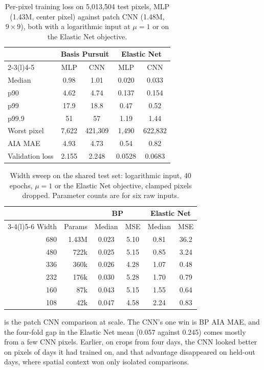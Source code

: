 \begin{table}[h]
\centering
\small
\caption{Per-pixel training loss on 5,013,504 test pixels, MLP (1.43M, center pixel) against patch CNN (1.48M, $9\times9$), both with a logarithmic input at $\mu=1$ or on the Elastic Net objective.}
\label{tab:cnn}
\begin{tabular}{@{}lcccc@{}}
\toprule
 & \multicolumn{2}{c}{Basis Pursuit} & \multicolumn{2}{c}{Elastic Net}\\
\cmidrule(lr){2-3}\cmidrule(l){4-5}
 & MLP & CNN & MLP & CNN\\
\midrule
Median & 0.98 & 1.01 & 0.020 & 0.033\\
p90 & 4.62 & 4.74 & 0.137 & 0.154\\
p99 & 17.9 & 18.8 & 0.47 & 0.52\\
p99.9 & 51 & 57 & 1.19 & 1.44\\
Worst pixel & 7,622 & 421,309 & 1,490 & 622,832\\
AIA MAE & 4.93 & 4.73 & 0.54 & 0.82\\
Validation loss & 2.155 & 2.248 & 0.0528 & 0.0683\\
\bottomrule
\end{tabular}
\end{table}

\begin{table}[h]
\centering
\small
\caption{Width sweep on the shared test set: logarithmic input, 40 epochs, $\mu=1$ or the Elastic Net objective, clamped pixels dropped. Parameter counts are for six raw inputs.}
\label{tab:sweep}
\setlength{\tabcolsep}{4pt}
\begin{tabular}{@{}rrcccc@{}}
\toprule
 & & \multicolumn{2}{c}{BP} & \multicolumn{2}{c}{Elastic Net}\\
\cmidrule(lr){3-4}\cmidrule(l){5-6}
Width & Params & Median & MSE & Median & MSE\\
\midrule
680 & 1.43M & 0.023 & 5.10 & 0.81 & 36.2\\
480 & 722k & 0.025 & 5.15 & 0.85 & 3.24\\
336 & 360k & 0.026 & 4.28 & 1.07 & 0.48\\
232 & 176k & 0.030 & 5.28 & 1.70 & 0.79\\
160 & 87k & 0.043 & 5.15 & 1.55 & 0.64\\
108 & 42k & 0.047 & 4.58 & 2.24 & 0.83\\
\bottomrule
\end{tabular}
\end{table}

 is the patch CNN comparison at scale. The CNN's one win is BP AIA MAE, and the four-fold gap in the Elastic Net mean (0.057 against 0.245) comes mostly from a few CNN pixels. Earlier, on crops from four days, the CNN looked better on pixels of days it had trained on, and that advantage disappeared on held-out days, where spatial context won only isolated comparisons.

